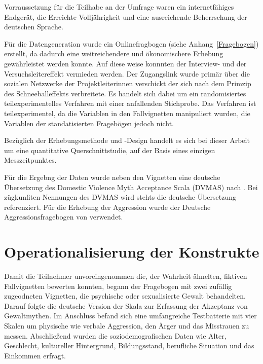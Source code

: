Vorraussetzung für die Teilhabe an der Umfrage waren ein internetfähiges Endgerät, die Erreichte Volljährigkeit und eine ausreichende Beherrschung der deutschen Sprache. 

Für die Datengeneration wurde ein Onlinefragbogen (siehe Anhang~\ref{Fragebogen}) erstellt, da dadurch eine weitreichendere und ökonomischere Erhebung gewährleistet werden konnte. Auf diese weise konnnten der Interview- und der Versuchsleitereffekt vermieden werden. Der Zugangslink wurde primär über die sozialen Netzwerke der Projektleiterinnen verschickt der sich nach dem Primzip des Schneeballeffekts verbreitete. Es handelt sich dabei um ein randomisiertes teilexperimentelles Verfahren mit einer anfallenden Stichprobe. Das Verfahren ist teilexperimentel, da die Variablen in den Fallvignetten manipuliert wurden, die Variablen der standatisierten Fragebögen jedoch nicht.

Bezüglich der Erhebungsmethode und -Design handelt es sich bei dieser Arbeit um eine quantitative Querschnittstudie, auf der Basis eines einzigen Messzeitpunktes.

Für die Ergebng der Daten wurde neben den Vignetten eine deutsche Übersetzung des Domestic Violence Myth Acceptance Scala (DVMAS) nach \textcite{Peters2003}. Bei zügkunfiten Nennungen des DVMAS wird stehts die deutsche Übersetzung referenziert. Für die Erhebung der Aggression wurde der Deutsche Aggressionsfragebogen von \textcite{Aggressionsfragebogen} verwendet.


\section{Operationalisierung der Konstrukte}    \label{sec_3.3}
Damit die Teilnehmer unvoreingenommen die, der Wahrheit ähnelten, fiktiven Fallvignetten bewerten konnten, begann der Fragebogen mit zwei zufällig zugeodneten Vignetten, die psychische oder sexualisierte Gewalt behandelten. Darauf folgte die deutsche Version der Skala zur Erfassung der Akzeptanz von Gewaltmythen. Im Anschluss befand sich eine umfangreiche Testbatterie mit vier Skalen um physische wie verbale Aggression, den Ärger und das Misstrauen zu messen. Abschließend wurden die soziodemografischen Daten wie Alter, Geschlecht, kultureller Hintergrund, Bildungsstand, berufliche Situation und das Einkommen erfragt.

